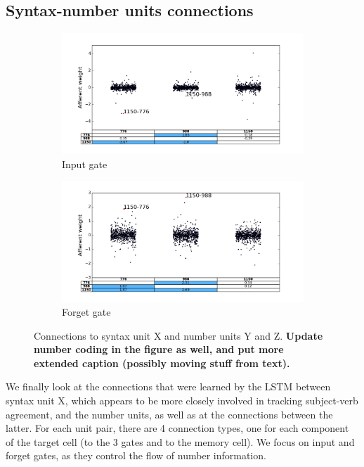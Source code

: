 \subsection{Syntax-number units connections}

\begin{figure}[t]
    \centering
    \begin{subfigure}{0.49\textwidth}
            \centering
            \includegraphics[width=\textwidth]{Figures/gate_Input_afferent_interactions.png}
            \caption{Input gate}
            \label{fig:interaction-input}
    \end{subfigure}
    \begin{subfigure}{0.49\textwidth}
           \centering
          \includegraphics[width=\textwidth]{Figures/gate_Forget_afferent_interactions.png}
          \caption{Forget gate}
          \label{fig:interaction-forget}
    \end{subfigure}
\caption{Connections to syntax unit X and number units Y and Z. \textbf{Update number coding in the figure as well, and put more extended caption (possibly moving stuff from text).}}
\label{fig:interaction}
\end{figure}

We finally look at the connections that were learned by the LSTM
between syntax unit X, which appears to be more closely involved in
tracking subject-verb agreement, and the number units, as well as at
the connections between the latter. For each unit pair, there are 4
connection types, one for each component of the target cell (to the 3
gates and to the memory cell). We focus on input and forget gates, as they control the flow of number information.

